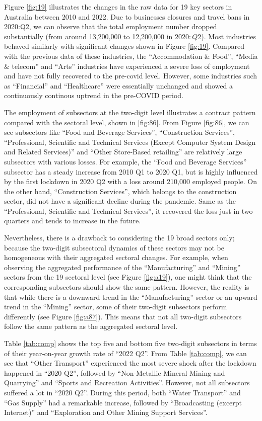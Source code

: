 \documentclass{monashthesis}
\begin{document}
Figure \ref{fig:19} illustrates the changes in the raw data for 19 key sectors in Australia between 2010 and 2022. Due to businesses closures and travel bans in 2020:Q2, we can observe that the total employment number dropped substantially (from around 13,200,000 to 12,200,000 in \(2020:Q2\)). Most industries behaved similarly with significant changes shown in Figure \ref{fig:19}. Compared with the previous data of these industries, the ``Accommodation \& Food'', ``Media \& telecom'' and ``Arts'' industries have experienced a severe loss of employment and have not fully recovered to the pre-covid level. However, some industries such as ``Financial'' and ``Healthcare'' were essentially unchanged and showed a continuously continous uptrend in the pre-COVID period.

The employment of subsectors at the two-digit level illustrates a contract pattern compared with the sectoral level, shown in \ref{fig:86}. From Figure \ref{fig:86}, we can see subsectors like ``Food and Beverage Services'', ``Construction Services'', ``Professional, Scientific and Technical Services (Except Computer System Design and Related Services)'' and ``Other Store-Based retailing'' are relatively large subsectors with various losses. For example, the ``Food and Beverage Services'' subsector has a steady increase from 2010 Q1 to 2020 Q1, but is highly influenced by the first lockdown in 2020 Q2 with a loss around 210,000 employed people. On the other hand, ``Construction Services'', which belongs to the construction sector, did not have a significant decline during the pandemic. Same as the ``Professional, Scientific and Technical Services'', it recovered the loss just in two quarters and tends to increase in the future.

Nevertheless, there is a drawback to considering the 19 broad sectors only; because the two-digit subsectoral dynamics of these sectors may not be homogeneous with their aggregated sectoral changes. For example, when observing the aggregated performance of the ``Manufacturing'' and ``Mining'' sectors from the 19 sectoral level (see Figure \ref{fig:a19}), one might think that the corresponding subsectors should show the same pattern. However, the reality is that while there is a downward trend in the ``Manufacturing'' sector or an upward trend in the ``Mining'' sector, some of their two-digit subsectors perform differently (see Figure \ref{fig:a87}). This means that not all two-digit subsectors follow the same pattern as the aggregated sectoral level.

Table \ref{tab:comp} shows the top five and bottom five two-digit subsectors in terms of their year-on-year growth rate of ``2022 Q2''. From Table \ref{tab:comp}, we can see that ``Other Transport'' experienced the most severe shock after the lockdown happened in ``2020 Q2'', followed by ``Non-Metallic Mineral Mining and Quarrying'' and ``Sports and Recreation Activities''. However, not all subsectors suffered a lot in ``2020 Q2''. During this period, both ``Water Transport'' and ``Gas Supply'' had a remarkable increase, followed by ``Broadcasting (excerpt Internet)'' and ``Exploration and Other Mining Support Services''.
\end{document}
